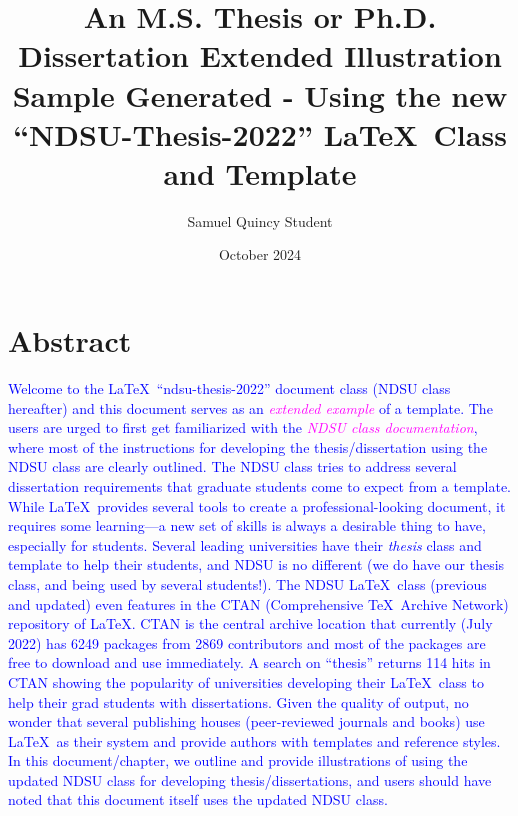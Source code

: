\documentclass[phd]{ndsu-thesis-2022}
\title{\vspace{3pt}An M.S. Thesis or Ph.D. Dissertation Extended Illustration Sample Generated - Using the new ``NDSU-Thesis-2022'' \LaTeX\ Class and Template}
\author{Samuel Quincy Student}
\date{October 2024}
\newcommand\italk[1]{\textcolor{blue}{#1}}  %
\begin{document}


\section{Abstract}
\italk{Welcome to the \LaTeX\ ``ndsu-thesis-2022'' document class (NDSU class hereafter) and this document serves as an \textcolor{magenta}{\emph{extended example}} of a template. The users are urged to first get familiarized with the \textcolor{magenta}{\emph{NDSU class documentation}}, where most of the instructions for developing the thesis/dissertation using the NDSU class are clearly outlined. The NDSU class tries to address several dissertation requirements that graduate students come to expect from a template. While \LaTeX\ provides several tools to create a professional-looking document, it requires some learning---a new set of skills is always a desirable thing to have, especially for students. Several leading universities have their \emph{thesis} class and template to help their students, and NDSU is no different (we do have our thesis class, and being used by several students!). The NDSU \LaTeX\ class (previous and updated) even features in the CTAN (Comprehensive \TeX\ Archive Network) repository of \LaTeX. CTAN is the central archive location that currently (July 2022) has 6249 packages from 2869 contributors and most of the packages are free to download and use immediately. A search on ``thesis'' returns 114 hits in CTAN showing the popularity of universities developing their \LaTeX\ class to help their grad students with dissertations. Given the quality of output, no wonder that several publishing houses (peer-reviewed journals and books) use \LaTeX\ as their system and provide authors with templates and reference styles. In this document/chapter, we outline and provide illustrations of using the updated NDSU class for developing thesis/dissertations, and users should have noted that this document itself uses the updated NDSU class.\\ 
}
\end{document}
